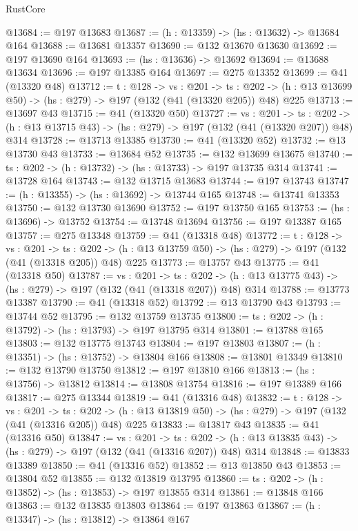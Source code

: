 \begin{lexlean}{RustCore}
\begin{coremodule}
@13684 := @197 @13683
@13687 := (h : @13359) -> (hs : @13632) -> @13684 @164
@13688 := @13681 @13357
@13690 := @132 @13670 @13630
@13692 := @197 @13690 @164
@13693 := (hs : @13636) -> @13692
@13694 := @13688 @13634
@13696 := @197 @13385 @164
@13697 := @275 @13352
@13699 := @41 (@13320 @48)
@13712 := {t : @128} ->
  {vs : @201} ->
  {ts : @202} -> (h : @13 @13699 @50) -> (hs : @279) -> @197 (@132 (@41 (@13320 @205)) @48) @225
@13713 := @13697 @43
@13715 := @41 (@13320 @50)
@13727 := {vs : @201} ->
  {ts : @202} -> (h : @13 @13715 @43) -> (hs : @279) -> @197 (@132 (@41 (@13320 @207)) @48) @314
@13728 := @13713 @13385
@13730 := @41 (@13320 @52)
@13732 := @13 @13730 @43
@13733 := @13684 @52
@13735 := @132 @13699 @13675
@13740 := {ts : @202} -> (h : @13732) -> (hs : @13733) -> @197 @13735 @314
@13741 := @13728 @164
@13743 := @132 @13715 @13683
@13744 := @197 @13743
@13747 := (h : @13355) -> (hs : @13692) -> @13744 @165
@13748 := @13741 @13353
@13750 := @132 @13730 @13690
@13752 := @197 @13750 @165
@13753 := (hs : @13696) -> @13752
@13754 := @13748 @13694
@13756 := @197 @13387 @165
@13757 := @275 @13348
@13759 := @41 (@13318 @48)
@13772 := {t : @128} ->
  {vs : @201} ->
  {ts : @202} -> (h : @13 @13759 @50) -> (hs : @279) -> @197 (@132 (@41 (@13318 @205)) @48) @225
@13773 := @13757 @43
@13775 := @41 (@13318 @50)
@13787 := {vs : @201} ->
  {ts : @202} -> (h : @13 @13775 @43) -> (hs : @279) -> @197 (@132 (@41 (@13318 @207)) @48) @314
@13788 := @13773 @13387
@13790 := @41 (@13318 @52)
@13792 := @13 @13790 @43
@13793 := @13744 @52
@13795 := @132 @13759 @13735
@13800 := {ts : @202} -> (h : @13792) -> (hs : @13793) -> @197 @13795 @314
@13801 := @13788 @165
@13803 := @132 @13775 @13743
@13804 := @197 @13803
@13807 := (h : @13351) -> (hs : @13752) -> @13804 @166
@13808 := @13801 @13349
@13810 := @132 @13790 @13750
@13812 := @197 @13810 @166
@13813 := (hs : @13756) -> @13812
@13814 := @13808 @13754
@13816 := @197 @13389 @166
@13817 := @275 @13344
@13819 := @41 (@13316 @48)
@13832 := {t : @128} ->
  {vs : @201} ->
  {ts : @202} -> (h : @13 @13819 @50) -> (hs : @279) -> @197 (@132 (@41 (@13316 @205)) @48) @225
@13833 := @13817 @43
@13835 := @41 (@13316 @50)
@13847 := {vs : @201} ->
  {ts : @202} -> (h : @13 @13835 @43) -> (hs : @279) -> @197 (@132 (@41 (@13316 @207)) @48) @314
@13848 := @13833 @13389
@13850 := @41 (@13316 @52)
@13852 := @13 @13850 @43
@13853 := @13804 @52
@13855 := @132 @13819 @13795
@13860 := {ts : @202} -> (h : @13852) -> (hs : @13853) -> @197 @13855 @314
@13861 := @13848 @166
@13863 := @132 @13835 @13803
@13864 := @197 @13863
@13867 := (h : @13347) -> (hs : @13812) -> @13864 @167

\end{coremodule}
\end{lexlean}
